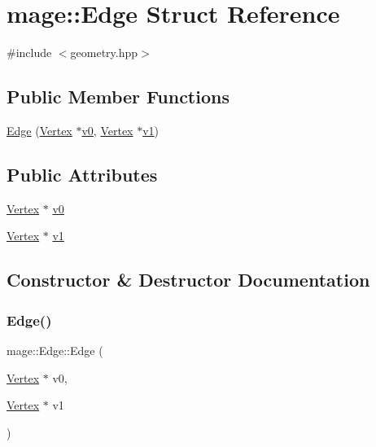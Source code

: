 \hypertarget{structmage_1_1_edge}{}\section{mage\+:\+:Edge Struct Reference}
\label{structmage_1_1_edge}


{\ttfamily \#include $<$geometry.\+hpp$>$}

\subsection*{Public Member Functions}
\begin{DoxyCompactItemize}
\item 
\hyperlink{structmage_1_1_edge_ae02d9b1c72160ca43f053b742d04fc32}{Edge} (\hyperlink{structmage_1_1_vertex}{Vertex} $\ast$\hyperlink{structmage_1_1_edge_a2558fb174f3d4cbf4b4732604236ec10}{v0}, \hyperlink{structmage_1_1_vertex}{Vertex} $\ast$\hyperlink{structmage_1_1_edge_a10072b2b5d8897431d0e4beb6eaf1ad1}{v1})
\end{DoxyCompactItemize}
\subsection*{Public Attributes}
\begin{DoxyCompactItemize}
\item 
\hyperlink{structmage_1_1_vertex}{Vertex} $\ast$ \hyperlink{structmage_1_1_edge_a2558fb174f3d4cbf4b4732604236ec10}{v0}
\item 
\hyperlink{structmage_1_1_vertex}{Vertex} $\ast$ \hyperlink{structmage_1_1_edge_a10072b2b5d8897431d0e4beb6eaf1ad1}{v1}
\end{DoxyCompactItemize}


\subsection{Constructor \& Destructor Documentation}
\hypertarget{structmage_1_1_edge_ae02d9b1c72160ca43f053b742d04fc32}{}\label{structmage_1_1_edge_ae02d9b1c72160ca43f053b742d04fc32} 
\subsubsection{\texorpdfstring{Edge()}{Edge()}}
{\footnotesize\ttfamily mage\+::\+Edge\+::\+Edge (\begin{DoxyParamCaption}\item[{\hyperlink{structmage_1_1_vertex}{Vertex} $\ast$}]{v0,  }\item[{\hyperlink{structmage_1_1_vertex}{Vertex} $\ast$}]{v1 }\end{DoxyParamCaption})}



